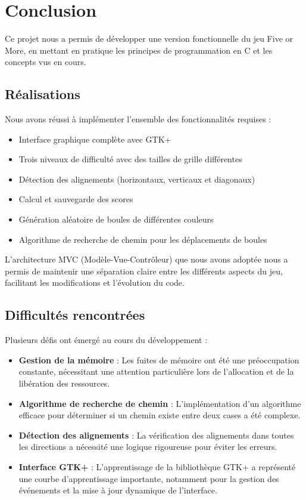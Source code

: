 \section{Conclusion}\label{conclusion}

Ce projet nous a permis de développer une version fonctionnelle du jeu Five or More, en mettant en pratique les principes de programmation en C et les concepts vus en cours.

\subsection{Réalisations}

Nous avons réussi à implémenter l'ensemble des fonctionnalités requises :
\begin{itemize}
    \item Interface graphique complète avec GTK+
    \item Trois niveaux de difficulté avec des tailles de grille différentes
    \item Détection des alignements (horizontaux, verticaux et diagonaux)
    \item Calcul et sauvegarde des scores
    \item Génération aléatoire de boules de différentes couleurs
    \item Algorithme de recherche de chemin pour les déplacements de boules
\end{itemize}

L'architecture MVC (Modèle-Vue-Contrôleur) que nous avons adoptée nous a permis de maintenir une séparation claire entre les différents aspects du jeu, facilitant les modifications et l'évolution du code.

\subsection{Difficultés rencontrées}

Plusieurs défis ont émergé au cours du développement :
\begin{itemize}
    \item \textbf{Gestion de la mémoire} : Les fuites de mémoire ont été une préoccupation constante, nécessitant une attention particulière lors de l'allocation et de la libération des ressources.
    \item \textbf{Algorithme de recherche de chemin} : L'implémentation d'un algorithme efficace pour déterminer si un chemin existe entre deux cases a été complexe.
    \item \textbf{Détection des alignements} : La vérification des alignements dans toutes les directions a nécessité une logique rigoureuse pour éviter les erreurs.
    \item \textbf{Interface GTK+} : L'apprentissage de la bibliothèque GTK+ a représenté une courbe d'apprentissage importante, notamment pour la gestion des événements et la mise à jour dynamique de l'interface.
\end{itemize}
